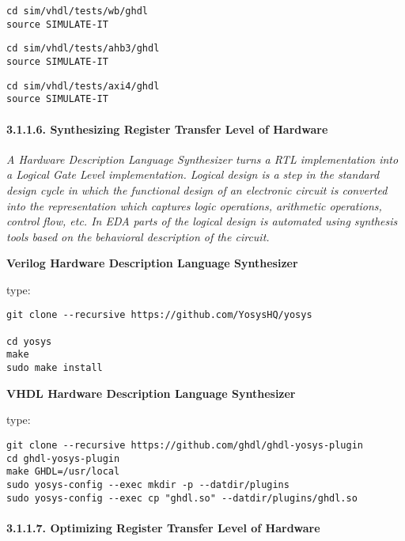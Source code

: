 \documentclass[]{article}
\let\oldparagraph\paragraph
\renewcommand{\paragraph}[1]{\oldparagraph{#1}\mbox{}}
\begin{document}
\begin{verbatim}
cd sim/vhdl/tests/wb/ghdl
source SIMULATE-IT
\end{verbatim}

\begin{verbatim}
cd sim/vhdl/tests/ahb3/ghdl
source SIMULATE-IT
\end{verbatim}

\begin{verbatim}
cd sim/vhdl/tests/axi4/ghdl
source SIMULATE-IT
\end{verbatim}

\paragraph{3.1.1.6. Synthesizing Register Transfer Level of
Hardware}\label{synthesizing-register-transfer-level-of-hardware}

\emph{A Hardware Description Language Synthesizer turns a RTL
implementation into a Logical Gate Level implementation. Logical design
is a step in the standard design cycle in which the functional design of
an electronic circuit is converted into the representation which
captures logic operations, arithmetic operations, control flow, etc. In
EDA parts of the logical design is automated using synthesis tools based
on the behavioral description of the circuit.}

\textbf{Verilog Hardware Description Language Synthesizer}

type:

\begin{verbatim}
git clone --recursive https://github.com/YosysHQ/yosys

cd yosys
make
sudo make install
\end{verbatim}

\textbf{VHDL Hardware Description Language Synthesizer}

type:

\begin{verbatim}
git clone --recursive https://github.com/ghdl/ghdl-yosys-plugin
cd ghdl-yosys-plugin
make GHDL=/usr/local
sudo yosys-config --exec mkdir -p --datdir/plugins
sudo yosys-config --exec cp "ghdl.so" --datdir/plugins/ghdl.so
\end{verbatim}

\paragraph{3.1.1.7. Optimizing Register Transfer Level of
Hardware}\label{optimizing-register-transfer-level-of-hardware}
\end{document}
